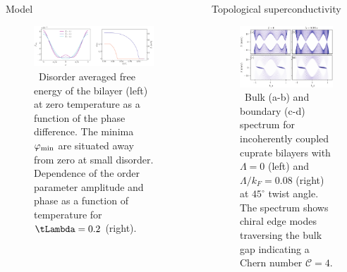 \documentclass[final]{beamer}
\newlength{\sepwid}
\newlength{\onecolwid}
\begin{document}
\begin{frame}[t]
\begin{columns}[t]
\begin{column}{\onecolwid}
\begin{block}{Model}
\begin{figure}
\includegraphics[width=\linewidth]{fig/latt_summ2.pdf}
\caption{\sffamily \,
	Disorder averaged free energy of the bilayer (left) at zero temperature as a
	function of the phase difference. The minima $\varphi_{\rm min}$ are
	situated away from zero at small disorder. Dependence of the
	order parameter amplitude and phase as a function of temperature for
$\tLambda=0.2$ (right).}
\label{fig:tarun}
\end{figure}


\end{block}





\end{column} %

\begin{column}{\sepwid}\end{column} %

\begin{column}{\onecolwid} %




\begin{block}{Topological superconductivity}



\begin{figure}[t]
	\centering
	\includegraphics[width=\columnwidth]{fig/spectrum.pdf}
	\caption{\sffamily \, Bulk (a-b) and boundary (c-d) spectrum for incoherently coupled
	cuprate bilayers with $\Lambda=0$ (left) and $\Lambda/k_F=0.08$ (right)
at $45^\circ$ twist angle. The spectrum shows chiral edge modes traversing the
bulk gap indicating a Chern number $\mathcal{C}=4$. }
	\label{fig:edgemode}
\end{figure}


\end{block}
\end{column}
\end{columns}
\end{frame}
\end{document}
